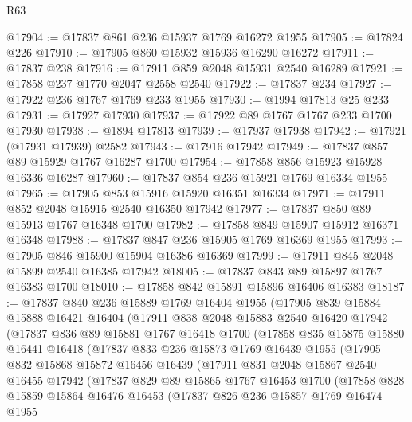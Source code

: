 \begin{lexlean}{R63}
\begin{coremodule}
@17904 := @17837 @861 @236 @15937 @1769 @16272 @1955
@17905 := @17824 @226
@17910 := @17905 @860 @15932 @15936 @16290 @16272
@17911 := @17837 @238
@17916 := @17911 @859 @2048 @15931 @2540 @16289
@17921 := @17858 @237 @1770 @2047 @2558 @2540
@17922 := @17837 @234
@17927 := @17922 @236 @1767 @1769 @233 @1955
@17930 := @1994 @17813 @25 @233
@17931 := @17927 @17930
@17937 := @17922 @89 @1767 @1767 @233 @1700 @17930
@17938 := @1894 @17813
@17939 := @17937 @17938
@17942 := @17921 (@17931 @17939) @2582
@17943 := @17916 @17942
@17949 := @17837 @857 @89 @15929 @1767 @16287 @1700
@17954 := @17858 @856 @15923 @15928 @16336 @16287
@17960 := @17837 @854 @236 @15921 @1769 @16334 @1955
@17965 := @17905 @853 @15916 @15920 @16351 @16334
@17971 := @17911 @852 @2048 @15915 @2540 @16350 @17942
@17977 := @17837 @850 @89 @15913 @1767 @16348 @1700
@17982 := @17858 @849 @15907 @15912 @16371 @16348
@17988 := @17837 @847 @236 @15905 @1769 @16369 @1955
@17993 := @17905 @846 @15900 @15904 @16386 @16369
@17999 := @17911 @845 @2048 @15899 @2540 @16385 @17942
@18005 := @17837 @843 @89 @15897 @1767 @16383 @1700
@18010 := @17858 @842 @15891 @15896 @16406 @16383
@18187 := @17837
    @840
    @236
    @15889
    @1769
    @16404
    @1955
    (@17905
      @839
      @15884
      @15888
      @16421
      @16404
      (@17911
        @838
        @2048
        @15883
        @2540
        @16420
        @17942
        (@17837
          @836
          @89
          @15881
          @1767
          @16418
          @1700
          (@17858
            @835
            @15875
            @15880
            @16441
            @16418
            (@17837
              @833
              @236
              @15873
              @1769
              @16439
              @1955
              (@17905
                @832
                @15868
                @15872
                @16456
                @16439
                (@17911
                  @831
                  @2048
                  @15867
                  @2540
                  @16455
                  @17942
                  (@17837
                    @829
                    @89
                    @15865
                    @1767
                    @16453
                    @1700
                    (@17858
                      @828
                      @15859
                      @15864
                      @16476
                      @16453
                      (@17837
                        @826
                        @236
                        @15857
                        @1769
                        @16474
                        @1955

\end{coremodule}
\end{lexlean}
